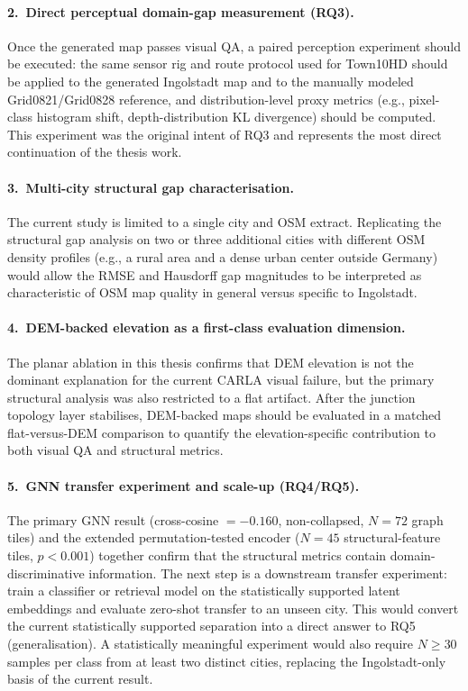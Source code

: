 \paragraph{2.\ Direct perceptual domain-gap measurement (RQ3).}
Once the generated map passes visual QA, a paired perception experiment should be executed: the same sensor rig and route protocol used for Town10HD should be applied to the generated Ingolstadt map and to the manually modeled Grid0821/Grid0828 reference, and distribution-level proxy metrics (e.g., pixel-class histogram shift, depth-distribution KL divergence) should be computed. This experiment was the original intent of RQ3 and represents the most direct continuation of the thesis work.

\paragraph{3.\ Multi-city structural gap characterisation.}
The current study is limited to a single city and OSM extract. Replicating the structural gap analysis on two or three additional cities with different OSM density profiles (e.g., a rural area and a dense urban center outside Germany) would allow the RMSE and Hausdorff gap magnitudes to be interpreted as characteristic of OSM map quality in general versus specific to Ingolstadt.

\paragraph{4.\ DEM-backed elevation as a first-class evaluation dimension.}
The planar ablation in this thesis confirms that DEM elevation is not the dominant explanation for the current CARLA visual failure, but the primary structural analysis was also restricted to a flat artifact. After the junction topology layer stabilises, DEM-backed maps should be evaluated in a matched flat-versus-DEM comparison to quantify the elevation-specific contribution to both visual QA and structural metrics.

\paragraph{5.\ GNN transfer experiment and scale-up (RQ4/RQ5).}
The primary GNN result (cross-cosine $= -0.160$, non-collapsed, $N=72$ graph tiles) and the extended permutation-tested encoder ($N=45$ structural-feature tiles, $p<0.001$) together confirm that the structural metrics contain domain-discriminative information. The next step is a downstream transfer experiment: train a classifier or retrieval model on the statistically supported latent embeddings and evaluate zero-shot transfer to an unseen city. This would convert the current statistically supported separation into a direct answer to RQ5 (generalisation). A statistically meaningful experiment would also require $N \geq 30$ samples per class from at least two distinct cities, replacing the Ingolstadt-only basis of the current result.

